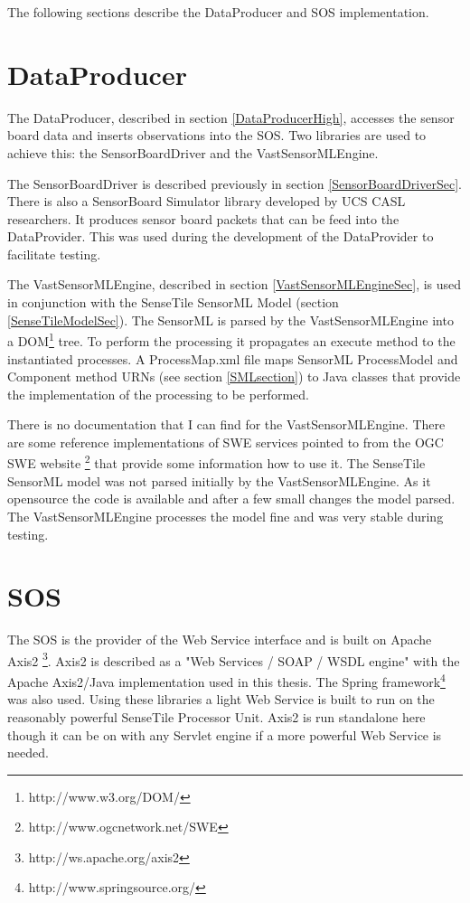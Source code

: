 \documentclass[]{final_report}
\begin{document}
The following sections describe the DataProducer and SOS implementation.
\section{DataProducer}
The DataProducer, described in section \ref{DataProducerHigh}, accesses the sensor board data and inserts observations into the SOS. Two libraries are used to achieve this: the SensorBoardDriver and the VastSensorMLEngine.

The SensorBoardDriver is described previously in section \ref{SensorBoardDriverSec}. There is also a SensorBoard Simulator library developed by UCS CASL researchers. It produces sensor board packets that can be feed into the DataProvider. This was used during the development of the DataProvider to facilitate testing. 

The VastSensorMLEngine, described in section \ref{VastSensorMLEngineSec}, is used in conjunction with the SenseTile SensorML Model (section \ref{SenseTileModelSec}). The SensorML is parsed by the VastSensorMLEngine into a DOM\footnote{http://www.w3.org/DOM/} tree. To perform the processing it propagates an execute method to the instantiated processes. A ProcessMap.xml file maps SensorML ProcessModel and Component method  URNs  (see section \ref{SMLsection}) to Java classes that provide the implementation of the processing to be performed. 

There is no documentation that I can find for the VastSensorMLEngine. There are some reference implementations of SWE services pointed to from the OGC SWE website \footnote{http://www.ogcnetwork.net/SWE} that provide some information how to use it. The SenseTile SensorML model was not parsed initially by the VastSensorMLEngine. As it opensource the code is available and after a few small changes the model parsed. The VastSensorMLEngine processes the model fine and was very stable during testing.


\section{SOS}
The SOS is the provider of the Web Service interface and is built on Apache Axis2 \footnote{http://ws.apache.org/axis2}. 
Axis2 is described as a "Web Services / SOAP / WSDL engine"  with the Apache Axis2/Java implementation used in this thesis. The Spring framework\footnote{http://www.springsource.org/} was also used. Using these libraries a light Web Service is built to run on the reasonably powerful SenseTile Processor Unit. Axis2 is run standalone here though it can be on with any Servlet engine if a more powerful Web Service is needed.
\end{document}
